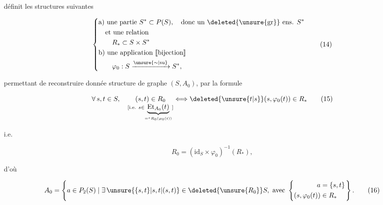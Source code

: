 définit les structures suivantes

\[
 \left\{\begin{aligned}
 &\text{a) une partie } S^*\subset P(S),\quad\text{donc un \deleted{\unsure{gr}} ens. }S^*\\
 &\quad\text{et une relation}\\
 &\qquad R_*\subset S\times S^*\\
 &\text{b) une application }[\![\text{bijection}]\!]\\
 &\qquad\varphi_0:S\xrightarrow{\unsure{\sim|\mathrm{su}}}S^*,
 \end{aligned}\right. \tag*{(14)}
\]

permettant de reconstruire 
donnée structure de graphe $(S,A_0)$, par la formule

\[
 \forall\,s,t\in S,\quad
 \underset{\substack{[\text{i.e. }s\in\underbrace{\mathrm{Et}_{A_0}(t)}_{={}^s R_0(\varphi_0(t))}]}}{(s,t)\in R_0}
 \Longleftrightarrow \deleted{\unsure{t|s}}(s,\varphi_0(t))\in R_* \tag*{(15)}
\]

i.e.

\[
 R_0=(\mathrm{id}_S\times\varphi_0)^{-1}(R_*), \tag*{$(15')$}
\]

d'où

\[
 A_0=\left\{a\in P_2(S)\mid\exists\,\unsure{\{s,t\}|s,t|(s,t)}\in\deleted{\unsure{R_0}}S,\ \text{avec }\left\{\begin{aligned}a&=\{s,t\}\\(s,\varphi_0(t))&\in R_*\end{aligned}\right.\right\}. \tag*{(16)}
\]

